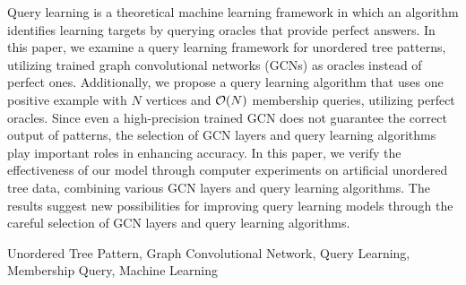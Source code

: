 \documentclass[submit]{ipsj}
\begin{document}
\begin{eabstract}
	Query learning is a theoretical machine learning framework in which an algorithm identifies learning targets by querying oracles that provide perfect answers. In this paper, we examine a query learning framework for unordered tree patterns, utilizing trained graph convolutional networks (GCNs) as oracles instead of perfect ones. Additionally, we propose a query learning algorithm that uses one positive example with $N$ vertices and ${\cal O}(N)$ membership queries, utilizing perfect oracles. Since even a high-precision trained GCN does not guarantee the correct output of patterns, the selection of GCN layers and query learning algorithms play important roles in enhancing accuracy. In this paper, we verify the effectiveness of our model through computer experiments on artificial unordered tree data, combining various GCN layers and query learning algorithms. The results suggest new possibilities for improving query learning models through the careful selection of GCN layers and query learning algorithms.
\end{eabstract}

\begin{ekeyword}
	Unordered Tree Pattern, Graph Convolutional Network, Query Learning, Membership Query, Machine Learning
\end{ekeyword}

\maketitle














\end{document}
